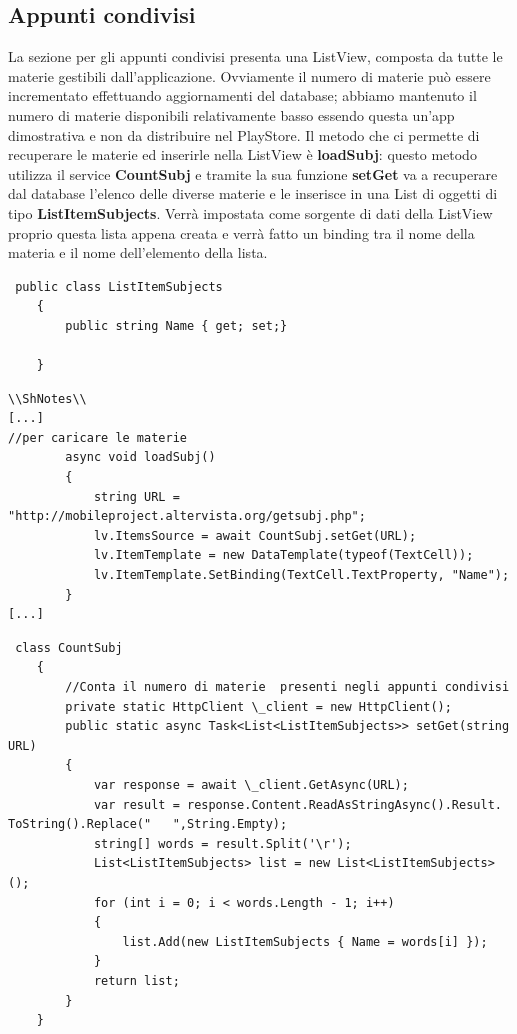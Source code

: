 \documentclass[a4paper, 50pt, twoside]{article}
\begin{document}
\subsection{Appunti condivisi}
La sezione per gli appunti condivisi presenta una ListView, composta da tutte le materie gestibili dall'applicazione. Ovviamente il numero di materie può essere incrementato effettuando aggiornamenti del database; abbiamo mantenuto il numero di materie disponibili relativamente basso essendo questa un'app dimostrativa e non da distribuire nel PlayStore. Il metodo che ci permette di recuperare le materie ed inserirle nella ListView è \textbf{loadSubj}: questo metodo utilizza il service \textbf{CountSubj} e tramite la sua funzione \textbf{setGet} va a recuperare dal database l'elenco delle diverse materie e le inserisce in una List di oggetti di tipo \textbf{ListItemSubjects}. Verrà impostata come sorgente di dati della ListView proprio questa lista appena creata e verrà fatto un binding tra il nome della materia e il nome dell'elemento della lista. 
\begin{lstlisting}
 public class ListItemSubjects
    {
        public string Name { get; set;}

    }
\end{lstlisting}
\newpage
\begin{lstlisting}
\\ShNotes\\
[...]
//per caricare le materie
        async void loadSubj()
        {
            string URL = "http://mobileproject.altervista.org/getsubj.php";
            lv.ItemsSource = await CountSubj.setGet(URL);
            lv.ItemTemplate = new DataTemplate(typeof(TextCell));
            lv.ItemTemplate.SetBinding(TextCell.TextProperty, "Name");
        }
[...]
\end{lstlisting}
\begin{lstlisting}
 class CountSubj
    {
        //Conta il numero di materie  presenti negli appunti condivisi
        private static HttpClient \_client = new HttpClient();
        public static async Task<List<ListItemSubjects>> setGet(string URL)
        {
            var response = await \_client.GetAsync(URL);
            var result = response.Content.ReadAsStringAsync().Result.
ToString().Replace("   ",String.Empty);
            string[] words = result.Split('\r');
            List<ListItemSubjects> list = new List<ListItemSubjects>();
            for (int i = 0; i < words.Length - 1; i++)
            {
                list.Add(new ListItemSubjects { Name = words[i] });
            }
            return list;
        }
    }
\end{lstlisting}
\end{document}
